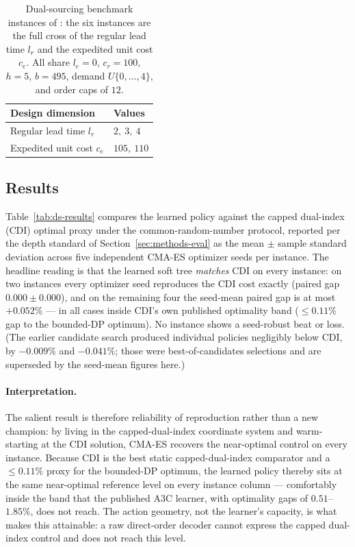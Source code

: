 \documentclass[11pt]{article}
\begin{document}
\begin{table}[!htbp]
\centering
\caption{Dual-sourcing benchmark instances of \citet{gijsbrechts2022drl}: the six instances are the
full cross of the regular lead time $l_r$ and the expedited unit cost $c_e$. All share $l_e=0$,
$c_r=100$, $h=5$, $b=495$, demand $U\{0,\dots,4\}$, and order caps of $12$.}
\label{tab:ds-params}
\begin{tabular}{ll}
\toprule
Design dimension & Values \\
\midrule
Regular lead time $l_r$ & $2,\ 3,\ 4$ \\
Expedited unit cost $c_e$ & $105,\ 110$ \\
\bottomrule
\end{tabular}
\end{table}
\FloatBarrier

\subsection{Results}

Table~\ref{tab:ds-results} compares the learned policy against the capped dual-index (CDI)
optimal proxy under the common-random-number protocol, reported per the depth standard of
Section~\ref{sec:methods-eval} as the mean $\pm$ sample standard deviation across five independent
CMA-ES optimizer seeds per instance. The headline reading is that the learned soft
tree \emph{matches} CDI on every instance: on two instances every optimizer seed reproduces the CDI
cost exactly (paired gap $0.000\pm0.000$), and on the remaining four the seed-mean paired gap is at
most $+0.052\%$ --- in all cases inside CDI's own published optimality band ($\le0.11\%$ gap to the
bounded-DP optimum). No instance shows a seed-robust beat or loss. (The earlier candidate search
produced individual policies negligibly below CDI, by $-0.009\%$ and $-0.041\%$; those were
best-of-candidates selections and are superseded by the seed-mean figures here.)
\paragraph{Interpretation.}
The salient result is therefore reliability of reproduction rather than a new champion: by living in
the capped-dual-index coordinate system and warm-starting at the CDI solution, CMA-ES recovers the
near-optimal control on every instance. Because CDI is the best static capped-dual-index comparator
and a $\le0.11\%$ proxy for the bounded-DP optimum, the learned policy thereby sits at the same
near-optimal reference level on every instance column --- comfortably inside the band that the
published A3C learner, with optimality gaps of $0.51$--$1.85\%$, does not reach. The action geometry,
not the learner's capacity, is what makes this attainable: a raw direct-order decoder cannot express
the capped dual-index control and does not reach this level.
\end{document}
